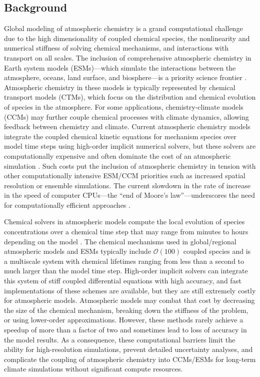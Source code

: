 \documentclass[gmd, manuscript]{copernicus}
\begin{document}
\subsection{Background}
Global modeling of atmospheric chemistry is a grand computational challenge due to the high dimensionality of coupled chemical species, the nonlinearity and numerical stiffness of solving chemical mechanisms, and interactions with transport on all scales. The inclusion of comprehensive atmospheric chemistry in Earth system models (ESMs)—which simulate the interactions between the atmosphere, oceans, land surface, and biosphere—is a priority science frontier \citep{national_research_council_national_2012}. Atmospheric chemistry in these models is typically represented by chemical transport models (CTMs), which focus on the distribution and chemical evolution of species in the atmosphere. For some applications, chemistry-climate models (CCMs) may further couple chemical processes with climate dynamics, allowing feedback between chemistry and climate. Current atmospheric chemistry models integrate the coupled chemical kinetic equations for mechanism species over model time steps using high-order implicit numerical solvers, but these solvers are computationally expensive \citep{sandu_benchmarking_1997} and often dominate the cost of an atmospheric simulation \citep{eastham_geos-chem_2018}. Such costs put the inclusion of atmospheric chemistry in tension with other computationally intensive ESM/CCM priorities such as increased spatial resolution or ensemble simulations. The current slowdown in the rate of increase in the speed of computer CPUs—the “end of Moore's law”—underscores the need for computationally efficient approaches \citep{theis_end_2017}.
 
Chemical solvers in atmospheric models compute the local evolution of species concentrations over a chemical time step that may range from minutes to hours depending on the model \citet{brasseur_modeling_2017}. The chemical mechanisms used in global/regional atmospheric models and ESMs typically include $\mathcal{O}(100)$ coupled species and is a multiscale system with chemical lifetimes ranging from less than a second to much larger than the model time step. High-order implicit solvers can integrate this system of stiff coupled differential equations with high accuracy, and fast implementations of these schemes are available, but they are still extremely costly for atmospheric models. Atmospheric models may combat that cost by decreasing the size of the chemical mechanism, breaking down the stiffness of the problem, or using lower-order approximations. However, these methods rarely achieve a speedup of more than a factor of two \citep{lin_adaptive_2023, shen_adaptive_2020} and sometimes lead to loss of accuracy in the model results. As a consequence, these computational barriers limit the ability for high-resolution simulations, prevent detailed uncertainty analyses, and complicate the coupling of atmospheric chemistry into CCMs/ESMs for long-term climate simulations without significant compute resources. 
 
\end{document}
